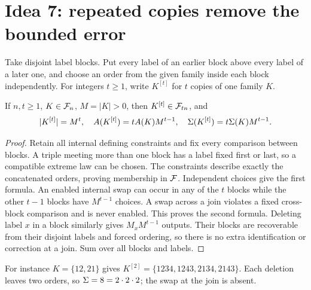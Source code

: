 \section{Idea 7: repeated copies remove the bounded error}\label{sec:copies}
\begin{definition}\label{def:concat}
Take disjoint label blocks. Put every label of an earlier block above
every label of a later one, and choose an order from the given family
inside each block independently. For integers \(t\geq1\), write \(K^{[t]}\) for \(t\) copies
of one family \(K\).
\end{definition}

\begin{lemma}\label{lem:copies}
If \(n,t\geq1\), \(K\in\mathcal F_n\), \(M=|K|>0\), then \(K^{[t]}\in\mathcal F_{tn}\), and
\[
 |K^{[t]}|=M^t,\quad
 A(K^{[t]})=tA(K)M^{t-1},\quad
 \Sigma(K^{[t]})=t\Sigma(K)M^{t-1}.
\]
\end{lemma}
\begin{proof}
Retain all internal defining constraints and fix every comparison
between blocks. A triple meeting more than one block has a label
fixed first or last, so a compatible extreme law can be chosen.
The constraints describe exactly the concatenated orders, proving
membership in \(\mathcal F\). Independent choices give the first formula.
An enabled internal swap can occur in any of the \(t\) blocks while
the other \(t-1\) blocks have \(M^{t-1}\) choices. A swap across a
join violates a fixed cross-block comparison and is never enabled.
This proves the second formula. Deleting label \(x\) in a block
similarly gives \(M_xM^{t-1}\) outputs. Their blocks are recoverable
from their disjoint labels and forced ordering, so there is no extra
identification or correction at a join. Sum over all blocks and labels.
\end{proof}

For instance \(K=\{12,21\}\) gives
\(K^{[2]}=\{1234,1243,2134,2143\}\). Each deletion leaves two
orders, so \(\Sigma=8=2\cdot2\cdot2\); the swap at the join is absent.

